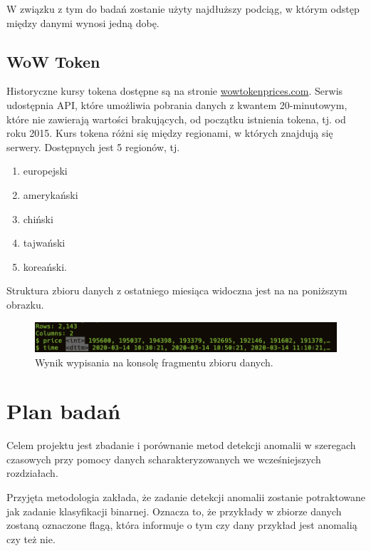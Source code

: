 \documentclass{article}
\begin{document}
W związku z tym do badań zostanie użyty najdłuższy podciąg, w którym
odstęp między danymi wynosi jedną dobę.

\hypertarget{wow-token}{%
\subsection{WoW Token}\label{wow-token}}

Historyczne kursy tokena dostępne są na stronie
\href{https://wowtokenprices.com/}{wowtokenprices.com}. Serwis
udostępnia API, które umożliwia pobrania danych z kwantem 20-minutowym,
które nie zawierają wartości brakujących, od początku istnienia tokena,
tj. od roku 2015. Kurs tokena różni się między regionami, w których
znajdują się serwery. Dostępnych jest 5 regionów, tj.

\begin{enumerate}
\def\labelenumi{\arabic{enumi}.}
\item
  europejski
\item
  amerykański
\item
  chiński
\item
  tajwański
\item
  koreański.
\end{enumerate}

Struktura zbioru danych z ostatniego miesiąca widoczna jest na na
poniższym obrazku.

\begin{figure}[H]
  \centering
  \includegraphics[width=.75\textwidth]{./images/wt-glimpse.png}
  \caption{Wynik wypisania na konsolę fragmentu zbioru danych.}
\end{figure}


\section{Plan badań \label{r6}}

Celem projektu jest zbadanie i porównanie metod detekcji anomalii w
szeregach czasowych przy pomocy danych scharakteryzowanych we
wcześniejszych rozdziałach.

Przyjęta metodologia zakłada, że zadanie detekcji anomalii zostanie
potraktowane jak zadanie klasyfikacji binarnej. Oznacza to, że przykłady
w zbiorze danych zostaną oznaczone flagą, która informuje o tym czy dany
przykład jest anomalią czy też nie.
\end{document}
